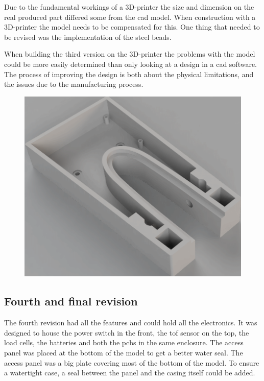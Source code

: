 Due to the fundamental workings of a 3D-printer the size and dimension on the real produced part differed some from the \gls{cad} model. When construction with a 3D-printer the model needs to be compensated for this. One thing that needed to be revised was the implementation of the steel beads.

When building the third version on the 3D-printer the problems with the model could be more easily determined than only looking at a design in a \gls{cad} software. The process of improving the design is both about the physical limitations, and the issues due to the manufacturing process.
\begin{figure}[H]
\begin{center}
	\includegraphics[width = .8\textwidth]{Figures/Case_rev_3.png}
	\label{Case_rev_3}
\end{center}
\end{figure}

\subsection{Fourth and final  revision}
The fourth revision had all the features and could hold all the electronics. It was designed to house the power switch in the front, the \gls{tof} sensor on the top, the load cells, the batteries and both the \gls{pcb}s in the same enclosure. The access panel was placed at the bottom of the model to get a better water seal. The access panel was a big plate covering most of the bottom of the model. To ensure a watertight case, a seal between the panel and the casing itself could be added. 

